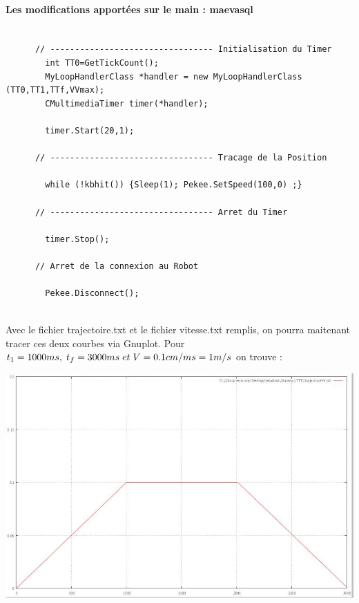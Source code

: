 \paragraph{Les modifications apportées sur le main : maeva\text{\_}sql\\[0.25 cm]}

\begin{lstlisting}	

	  // --------------------------------- Initialisation du Timer
		int TT0=GetTickCount();
		MyLoopHandlerClass *handler = new MyLoopHandlerClass (TT0,TT1,TTf,VVmax);
		CMultimediaTimer timer(*handler);

		timer.Start(20,1);

	  // --------------------------------- Tracage de la Position

		while (!kbhit()) {Sleep(1); Pekee.SetSpeed(100,0) ;}
 
	  // --------------------------------- Arret du Timer
		
		timer.Stop();

	  // Arret de la connexion au Robot

		Pekee.Disconnect();
	
\end{lstlisting}	

\par Avec le fichier trajectoire.txt et le fichier vitesse.txt remplis, on pourra maitenant tracer ces deux courbes via Gnuplot. Pour $t_1=1000ms, \hspace{1 mm} t_f= 3000ms \hspace{1 mm} et \hspace{1 mm} V= 0.1cm/ms=1m/s$ on trouve :\\
   
   	\begin{center}
	\includegraphics[scale=0.6]{V.JPG}
	\label{fig3} 
	\end{center}
	 

